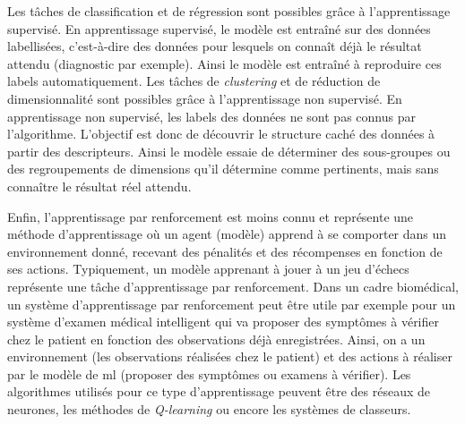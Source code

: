 Les tâches de classification et de régression sont possibles grâce à l'apprentissage supervisé. En apprentissage supervisé, le modèle est entraîné sur des données labellisées, c'est-à-dire des données pour lesquels on connaît déjà le résultat attendu (diagnostic par exemple). Ainsi le modèle est entraîné à reproduire ces labels automatiquement.
Les tâches de \textit{clustering} et de réduction de dimensionnalité sont possibles grâce à l'apprentissage non supervisé. En apprentissage non supervisé, les labels des données ne sont pas connus par l'algorithme. L'objectif est donc de découvrir le structure caché des données à partir des descripteurs. Ainsi le modèle essaie de déterminer des sous-groupes ou des regroupements de dimensions qu'il détermine comme pertinents, mais sans connaître le résultat réel attendu.

Enfin, l'apprentissage par renforcement est moins connu et représente une méthode d'apprentissage où un agent (modèle) apprend à se comporter dans un environnement donné, recevant des pénalités et des récompenses en fonction de ses actions. Typiquement,  un modèle apprenant à jouer à un jeu d'échecs représente une tâche d'apprentissage par renforcement. Dans un cadre biomédical, un système d'apprentissage par renforcement peut être utile par exemple pour un système d'examen médical intelligent qui va proposer des symptômes à vérifier chez le patient en fonction des observations déjà enregistrées. Ainsi, on a un environnement (les observations réalisées chez le patient) et des actions à réaliser par le modèle de \gls{ml} (proposer des symptômes ou examens à vérifier). Les algorithmes utilisés pour ce type d'apprentissage peuvent être des réseaux de neurones, les méthodes de \textit{Q-learning} ou encore les systèmes de classeurs.

